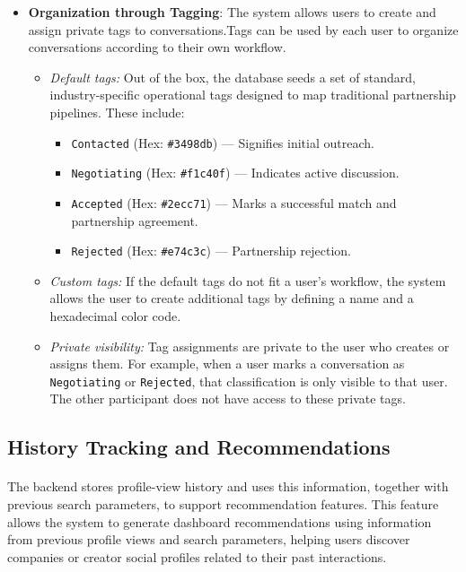 \begin{itemize}
\begin{itemize}
        \end{itemize}
    \item \textbf{Organization through Tagging}: The system allows users to create and assign private tags to conversations.Tags can be used by each user to organize conversations according to their own workflow.
    \begin{itemize}
    \item \textit{Default tags:} Out of the box, the database seeds a set of standard, industry-specific operational tags designed to map traditional partnership pipelines. These include:
    \begin{itemize}
        \item \texttt{Contacted} (Hex: \texttt{\#3498db}) — Signifies initial outreach.
        \item \texttt{Negotiating} (Hex: \texttt{\#f1c40f}) — Indicates active discussion.
        \item \texttt{Accepted} (Hex: \texttt{\#2ecc71}) — Marks a successful match and partnership agreement.
        \item \texttt{Rejected} (Hex: \texttt{\#e74c3c}) — Partnership rejection.
    \end{itemize}
    \item \textit{Custom tags:} If the default tags do not fit a user's workflow, the system allows the user to create additional tags by defining a name and a hexadecimal color code.
    \item \textit{Private visibility:} Tag assignments are private to the user who creates or assigns them. For example, when a user marks a conversation as \texttt{Negotiating} or \texttt{Rejected}, that classification is only visible to that user. The other participant does not have access to these private tags.
\end{itemize}
\end{itemize}

\subsection{History Tracking and Recommendations}
\paragraph{}The backend stores profile-view history and uses this information, together with previous search parameters, to support recommendation features. This feature allows the system to generate dashboard recommendations using information from previous profile views and search parameters, helping users discover companies or creator social profiles related to their past interactions.
